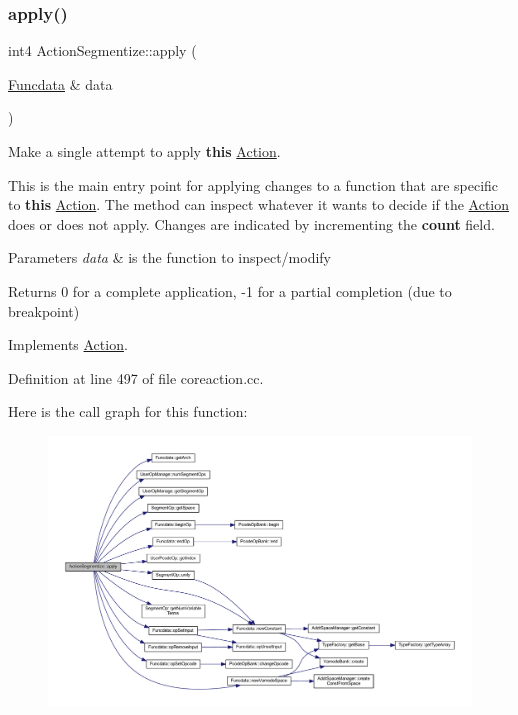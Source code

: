 \subsubsection{\texorpdfstring{apply()}{apply()}}
{\footnotesize\ttfamily int4 Action\+Segmentize\+::apply (\begin{DoxyParamCaption}\item[{\mbox{\hyperlink{class_funcdata}{Funcdata}} \&}]{data }\end{DoxyParamCaption})\hspace{0.3cm}{\ttfamily [virtual]}}



Make a single attempt to apply {\bfseries{this}} \mbox{\hyperlink{class_action}{Action}}. 

This is the main entry point for applying changes to a function that are specific to {\bfseries{this}} \mbox{\hyperlink{class_action}{Action}}. The method can inspect whatever it wants to decide if the \mbox{\hyperlink{class_action}{Action}} does or does not apply. Changes are indicated by incrementing the {\bfseries{count}} field. 
\begin{DoxyParams}{Parameters}
{\em data} & is the function to inspect/modify \\
\hline
\end{DoxyParams}
\begin{DoxyReturn}{Returns}
0 for a complete application, -\/1 for a partial completion (due to breakpoint) 
\end{DoxyReturn}


Implements \mbox{\hyperlink{class_action_aac1c3999d6c685b15f5d9765a4d04173}{Action}}.



Definition at line 497 of file coreaction.\+cc.

Here is the call graph for this function\+:
\nopagebreak
\begin{figure}[H]
\begin{center}
\leavevmode
\includegraphics[width=350pt]{class_action_segmentize_a3219ac91c09b6c6061d7e91ad1ed9111_cgraph}
\end{center}
\end{figure}
\mbox{\label{class_action_segmentize_a0fd9bb73aa71eefad72a93cde61a288b}} 
